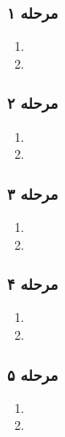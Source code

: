 \documentclass{article}
\begin{document}
\subsubsection*{مرحله ۱ }
\begin{center}
	\begin{enumerate}
		\item  {}
		\item  {}
		\end{enumerate}
\end{center}
\subsubsection*{مرحله ۲}
\begin{center}
	\begin{enumerate}
		\item {}
		\item {}
	\end{enumerate}
\end{center}
\subsubsection*{مرحله ۳ }
\begin{center}
	\begin{enumerate}
		\item  {}
		\item  {}
	\end{enumerate}
\end{center}
\subsubsection*{مرحله ۴ }
\begin{center}
	\begin{enumerate}
		\item  {}
		\item  {}
	\end{enumerate}
\end{center}
\subsubsection*{مرحله ۵ }
\begin{center}
	\begin{enumerate}
		\item  {}
		\item  {}
	\end{enumerate}
\end{center}
\end{document}

